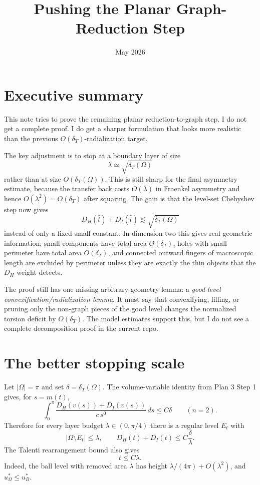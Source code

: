\documentclass[11pt]{article}
\title{Pushing the Planar Graph-Reduction Step}
\author{}
\date{May 2026}
\newcommand{\Om}{\Omega}
\newcommand{\dT}{\delta_T}
\begin{document}
\maketitle

\section{Executive summary}

This note tries to prove the remaining planar reduction-to-graph step.  I do
not get a complete proof.  I do get a sharper formulation that looks more
realistic than the previous \(O(\dT)\)-radialization target.

The key adjustment is to stop at a boundary layer of size
\[
   \lambda \simeq \sqrt{\dT(\Om)}
\]
rather than at size \(O(\dT(\Om))\).  This is still sharp for the final
asymmetry estimate, because the transfer back costs \(O(\lambda)\) in
Fraenkel asymmetry and hence \(O(\lambda^2)=O(\dT)\) after squaring.  The gain
is that the level-set Chebyshev step now gives
\[
   D_H(\hat t)+D_I(\hat t) \lesssim \sqrt{\dT(\Om)}
\]
instead of only a fixed small constant.  In dimension two this gives real
geometric information: small components have total area \(O(\dT)\), holes with
small perimeter have total area \(O(\dT)\), and connected outward fingers of
macroscopic length are excluded by perimeter unless they are exactly the thin
objects that the \(D_H\) weight detects.

The proof still has one missing arbitrary-geometry lemma: a
\emph{good-level convexification/radialization lemma}.  It must say that
convexifying, filling, or pruning only the non-graph pieces of the good level
changes the normalized torsion deficit by \(O(\dT)\).  The model estimates
support this, but I do not see a complete decomposition proof in the current
repo.

\section{The better stopping scale}

Let \(|\Om|=\pi\) and set \(\delta=\dT(\Om)\).  The volume-variable identity
from Plan 3 Step 1 gives, for \(s=m(t)\),
\[
   \int_0^\pi
      \frac{D_H(v(s))+D_I(v(s))}{c\,s^{0}}\,ds
      \le C\delta
      \qquad (n=2).
\]
Therefore for every layer budget \(\lambda\in(0,\pi/4)\) there is a regular
level \(E_t\) with
\[
   |\Om\setminus E_t|\le \lambda,
   \qquad
   D_H(t)+D_I(t)\le C\frac{\delta}{\lambda}.
   \tag{2.1}
\]
The Talenti rearrangement bound also gives
\[
   t\le C\lambda.
   \tag{2.2}
\]
Indeed, the ball level with removed area \(\lambda\) has height
\(\lambda/(4\pi)+O(\lambda^2)\), and \(u_\Om^*\le u_B^*\).
\end{document}
